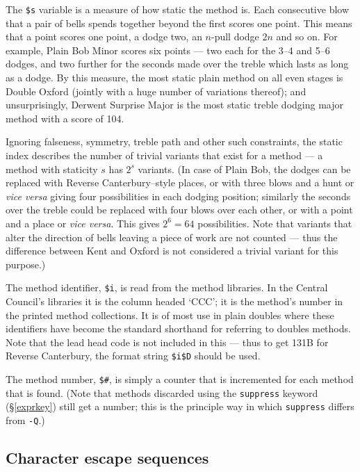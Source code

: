 \documentclass[a4paper,11pt,oneside]{book}
\makeatletter
\newcommand{\fspec}[1]{\index{#1@{\hspace*{-\fspecwidth}\texttt{\$#1}}}}
\newcommand{\sref}[1]{\hyperref[#1]{\S\ref{#1}}}
\makeatother
\begin{document}
The \verb+$s+\fspec{s} variable is a measure of how static the method is.
Each consecutive blow that a pair of bells spends together beyond the first 
scores one point.  This means that a point scores one point, a dodge two, an $n$-pull dodge $2n$ and so on. For example, Plain Bob Minor scores six points 
--- two each for the 3--4 and 5--6 dodges, and two further for the seconds made
over the treble which lasts as long as a dodge.  By this measure, the most 
static plain method on all even stages is Double Oxford (jointly with 
a huge number of variations thereof); and unsurprisingly, Derwent Surprise
Major is the most static treble dodging major method with a score of 104.  

Ignoring falseness,
symmetry, treble path and other such constraints, the static index describes
the number of trivial variants that exist for a method
--- a method with staticity $s$ has $2^s$ variants.  
(In case of Plain Bob, the dodges can be replaced with 
Reverse Canterbury--style places,
or with three blows and a hunt or \textit{vice versa} giving four 
possibilities in each dodging position; 
similarly the seconds over the treble could be replaced with four blows over
each other, or with a point and a place or \textit{vice versa}.  This gives
$2^6=64$ possibilities.  Note that variants that alter the direction of bells
leaving a piece of work are not counted --- thus the difference between
Kent and Oxford is not 
considered a trivial variant for this purpose.)

The method identifier, \verb+$i+, is read from the method libraries.  
In the Central Council's libraries it is the column headed `CCC';  
it is the method's number in the printed method collections.  It is of
most use in plain doubles where these identifiers have become the standard 
shorthand for referring to doubles methods.  Note that the lead head code
is not included in this --- thus to get 131B for Reverse Canterbury, the
format string \verb+$i$D+ should be used.

The method number, \verb+$#+, is simply a counter that is incremented for 
each method that is found.  (Note that methods discarded using the 
\verb+suppress+ keyword (\sref{exprkey})%
still get a number; this is the principle way in which \verb+suppress+
differs from \verb+-Q+.)

\subsection{Character escape sequences}\label{charesc}
\end{document}
